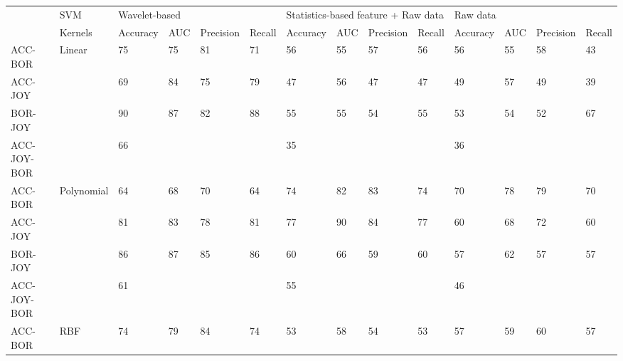 \begin{sidewaystable}[]
	\centering
	\label{svmknn}
	\resizebox{\columnwidth}{!}	{
	\begin{tabular}{llllllllllllll}
		
		\hline
		& SVM                            & \multicolumn{4}{l|}{Wavelet-based}   & \multicolumn{4}{l|}{Statistics-based feature + Raw data} & \multicolumn{4}{l}{Raw data}        \\ \cline{3-14} 
		& Kernels                     & Accuracy & AUC & Precision & Recall & Accuracy      & AUC      & Precision      & Recall      & Accuracy & AUC & Precision & Recall \\ \hline
		ACC-BOR     & \multirow{4}{*}{Linear}     & 75       & 75  & 81        & 71     & 56            & 55       & 57             & 56          & 56       & 55  & 58        & 43     \\
		ACC-JOY     &                             & 69       & 84  & 75        & 79     & 47            & 56       & 47             & 47          & 49       & 57  & 49        & 39     \\
		BOR-JOY     &                             & 90       & 87  & 82        & 88     & 55            & 55       & 54             & 55          & 53       & 54  & 52        & 67     \\
		ACC-JOY-BOR &                             & 66       &     &           &        & 35            &          &                &             & 36       &     &           &        \\
		ACC-BOR     & \multirow{4}{*}{Polynomial} & 64       & 68  & 70        & 64     & 74            & 82       & 83             & 74          & 70       & 78  & 79        & 70     \\
		ACC-JOY     &                             & 81       & 83  & 78        & 81     & 77            & 90       & 84             & 77          & 60       & 68  & 72        & 60     \\
		BOR-JOY     &                             & 86       & 87  & 85        & 86     & 60            & 66       & 59             & 60          & 57       & 62  & 57        & 57     \\
		ACC-JOY-BOR &                             & 61       &     &           &        & 55            &          &                &             & 46       &     &           &        \\
		ACC-BOR     & \multirow{4}{*}{RBF}        & 74       & 79  & 84        & 74     & 53            & 58       & 54             & 53          & 57       & 59  & 60        & 57     \\

\end{tabular}}
\end{sidewaystable}
